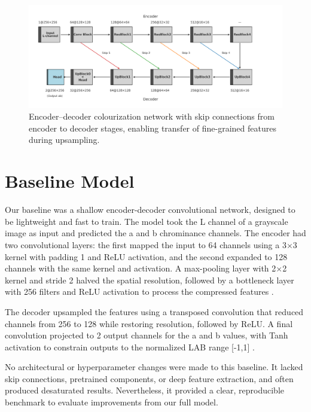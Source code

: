 \documentclass{article} %
\begin{document}
\begin{figure}[H]
  \centering
  \vspace{-1em} %
  \includegraphics[width=1.1\linewidth]{Figs/architecture-diagram.png}
  \vspace{-0.5em} %
  \caption{Encoder–decoder colourization network with skip connections from encoder to decoder stages, 
  enabling transfer of fine-grained features during upsampling.}
  \label{fig:architecture}
\end{figure}

\section{Baseline Model}
\label{baseline}

Our baseline was a shallow encoder-decoder convolutional network, designed to be lightweight and fast to train. The model took the L channel of a grayscale image as input and predicted 
the a and b chrominance channels. The encoder had two convolutional layers: the first mapped the input to 64 channels using a 3$\times$3 kernel with padding 1 and ReLU activation, and the 
second expanded to 128 channels with the same kernel and activation. A max-pooling layer with 2$\times$2 kernel and stride 2 halved the spatial resolution, followed by a bottleneck layer 
with 256 filters and ReLU activation to process the compressed features \citep{leatvanich2025image}.

The decoder upsampled the features using a transposed convolution that reduced channels from 256 to 128 while restoring resolution, followed by ReLU. A final convolution projected to 2 
output channels for the a and b values, with Tanh activation to constrain outputs to the normalized LAB range [-1,1] \citep{rosebrock2019bwcolorization}.

No architectural or hyperparameter changes were made to this baseline. It lacked skip connections, pretrained components, or deep feature extraction, and often produced desaturated results. 
Nevertheless, it provided a clear, reproducible benchmark to evaluate improvements from our full model.
\end{document}

